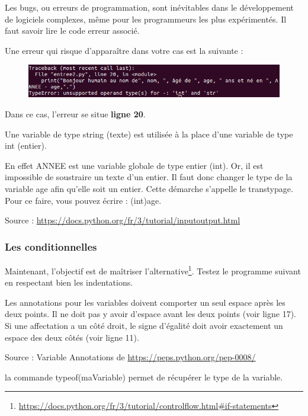 \begin{tcolorbox}[lefttitle=2cm, colframe=gray!75!blue, title= \textbf{Tip for Code 2 : "\textit{Le shell est votre ami}"}]
Les bugs, ou erreurs de programmation, sont inévitables dans le développement de logiciels complexes, même pour les programmeurs les plus expérimentés.
Il faut savoir lire le code erreur associé.

Une erreur qui risque d'apparaître dans votre cas est la suivante :
\begin{figure}[H]
    \centering
    \includegraphics[scale=0.6]{chapitre1/figures/entreeErr.png}
\end{figure}

Dans ce cas, l'erreur se situe \textbf{ligne 20}.

Une variable de type string (texte) est utilisée à la place d'une variable de type int (entier).

En effet ANNEE est une variable globale de type entier (int).
Or, il est impossible de soustraire un texte d'un entier.
Il faut donc changer le type de la variable age afin qu'elle soit un entier.
Cette démarche s'appelle le transtypage.
Pour ce faire, vous pouvez écrire : (int)age.

Source : \url{https://docs.python.org/fr/3/tutorial/inputoutput.html}

\end{tcolorbox}
\subsubsection{Les conditionnelles}
Maintenant, l'objectif est de maîtriser l'alternative\footnote{ \url{https://docs.python.org/fr/3/tutorial/controlflow.html\#if-statements}}.
Testez le programme suivant en respectant bien les indentations.






\begin{tcolorbox}[lefttitle=2cm, colframe=gray!75!blue, title= \textbf{Tip for Code 3 : Indentations et espaces}]

Les annotations pour les variables doivent comporter un seul espace après les deux points.
    Il ne doit pas y avoir d'espace avant les deux points (voir ligne 17).
    Si une affectation a un côté droit, le signe d'égalité doit avoir exactement un espace des deux côtés (voir ligne 11).

Source : Variable Annotations de \url{https://peps.python.org/pep-0008/}

la commande typeof(maVariable) permet de récupérer le type de la variable.

\end{tcolorbox}

